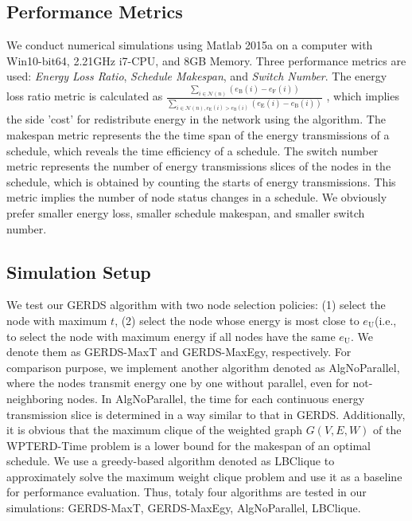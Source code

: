 \documentclass[journal,10pt]{IEEEtran}
\begin{document}
\subsection{Performance Metrics}
We conduct numerical simulations using Matlab 2015a on a computer with Win10-bit64, 2.21GHz i7-CPU, and 8GB Memory. Three performance metrics are used: \textit{Energy Loss Ratio}, \textit{Schedule Makespan}, and \textit{Switch Number}. The energy loss ratio metric is calculated as  $\frac{\sum_{i{\in}\mathcal{N}(n)}(e_\text{B}(i){-}e_\text{F}(i))}{\sum_{i{\in}\mathcal{N}(n),e_\text{E}(i){>}e_\text{B}(i)}(e_\text{E}(i){-}e_\text{B}(i))}$   , which implies the side 'cost' for redistribute energy in the network using the algorithm. The makespan metric represents the the time span of the energy transmissions of a schedule, which reveals the time efficiency of a schedule. The switch number metric represents the number of energy transmissions slices of the nodes in the schedule, which is obtained by counting the starts of energy transmissions. This metric implies the number of node status changes in a schedule. We obviously prefer smaller energy loss, smaller schedule makespan, and smaller switch number.

\subsection{Simulation Setup}
We test our GERDS algorithm with two node selection policies: (1) select the node with maximum $t$, (2) select the node whose energy is most close to $e_\text{U}$(i.e., to select the node with maximum energy if all nodes have the same $e_\text{U}$. We denote them as GERDS-MaxT and GERDS-MaxEgy, respectively. For comparison purpose, we implement another algorithm denoted as AlgNoParallel, where the nodes transmit energy one by one without parallel, even for not-neighboring nodes. In AlgNoParallel, the time for each continuous energy transmission slice is determined in a way similar to that in GERDS. Additionally, it is obvious that the maximum clique of the weighted graph $G(V,E,W)$ of the WPTERD-Time problem  is a lower bound for the makespan of an optimal schedule. We use a greedy-based algorithm denoted as LBClique to approximately solve the maximum weight clique problem and use it as a baseline for performance evaluation. Thus, totaly four algorithms are tested in our simulations: GERDS-MaxT, GERDS-MaxEgy, AlgNoParallel, LBClique.
\end{document}
